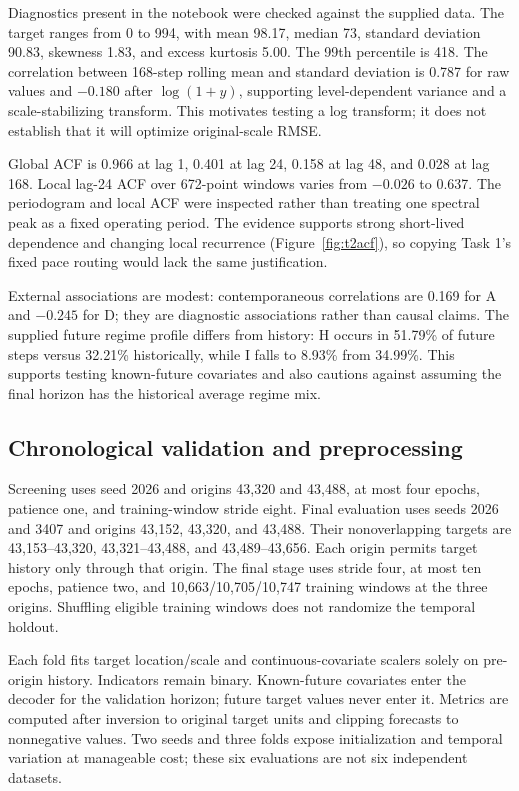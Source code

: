 \documentclass[11pt,a4paper]{article}
\begin{document}
Diagnostics present in the notebook were checked against the supplied data. The target ranges from 0 to 994, with mean 98.17, median 73, standard deviation 90.83, skewness 1.83, and excess kurtosis 5.00. The 99th percentile is 418. The correlation between 168-step rolling mean and standard deviation is 0.787 for raw values and $-0.180$ after $\log(1+y)$, supporting level-dependent variance and a scale-stabilizing transform. This motivates testing a log transform; it does not establish that it will optimize original-scale RMSE.

Global ACF is 0.966 at lag 1, 0.401 at lag 24, 0.158 at lag 48, and 0.028 at lag 168. Local lag-24 ACF over 672-point windows varies from $-0.026$ to 0.637. The periodogram and local ACF were inspected rather than treating one spectral peak as a fixed operating period. The evidence supports strong short-lived dependence and changing local recurrence (Figure~\ref{fig:t2acf}), so copying Task 1's fixed pace routing would lack the same justification.

External associations are modest: contemporaneous correlations are 0.169 for A and $-0.245$ for D; they are diagnostic associations rather than causal claims. The supplied future regime profile differs from history: H occurs in 51.79\% of future steps versus 32.21\% historically, while I falls to 8.93\% from 34.99\%. This supports testing known-future covariates and also cautions against assuming the final horizon has the historical average regime mix.

\subsection*{Chronological validation and preprocessing}
Screening uses seed 2026 and origins 43,320 and 43,488, at most four epochs, patience one, and training-window stride eight. Final evaluation uses seeds 2026 and 3407 and origins 43,152, 43,320, and 43,488. Their nonoverlapping targets are 43,153--43,320, 43,321--43,488, and 43,489--43,656. Each origin permits target history only through that origin. The final stage uses stride four, at most ten epochs, patience two, and 10,663/10,705/10,747 training windows at the three origins. Shuffling eligible training windows does not randomize the temporal holdout.

Each fold fits target location/scale and continuous-covariate scalers solely on pre-origin history. Indicators remain binary. Known-future covariates enter the decoder for the validation horizon; future target values never enter it. Metrics are computed after inversion to original target units and clipping forecasts to nonnegative values. Two seeds and three folds expose initialization and temporal variation at manageable cost; these six evaluations are not six independent datasets.
\end{document}
